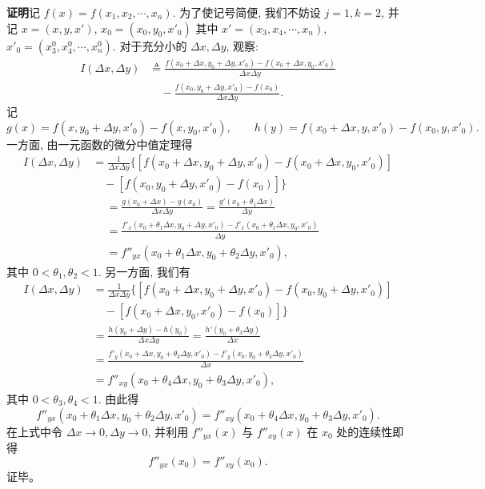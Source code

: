 \documentclass[UTF8,12pt,a4paper,fontset=fandol]{ctexart}
\begin{document}
\noindent\textbf{证明}\quad 记 $f(x)=f(x_1,x_2,\cdots,x_n)$. 为了使记号简便, 我们不妨设 $j=1,k=2$, 并记 $x=(x,y,x')$, $x_0=(x_0,y_0,x'_0)$ 其中 $x'=(x_3,x_4,\cdots,x_n)$, $x'_0=(x_3^0,x_4^0,\cdots,x_n^0)$. 对于充分小的 $\Delta x,\Delta y$, 观察:
\[
\begin{aligned}
  I(\Delta x,\Delta y)
  &\triangleq
  \frac{f(x_0+\Delta x,y_0+\Delta y,x'_0)-f(x_0+\Delta x,y_0,x'_0)}{\Delta x\Delta y}\\
  &\quad-\frac{f(x_0,y_0+\Delta y,x'_0)-f(x_0)}{\Delta x\Delta y}.
\end{aligned}
\]
记
\[
  g(x)=f(x,y_0+\Delta y,x'_0)-f(x,y_0,x'_0),
  \qquad
  h(y)=f(x_0+\Delta x,y,x'_0)-f(x_0,y,x'_0).
\]
一方面, 由一元函数的微分中值定理得
\[
\begin{aligned}
  I(\Delta x,\Delta y)
  &=\frac1{\Delta x\Delta y}
  \{[f(x_0+\Delta x,y_0+\Delta y,x'_0)-f(x_0+\Delta x,y_0,x'_0)]\\
  &\quad-[f(x_0,y_0+\Delta y,x'_0)-f(x_0)]\}
\end{aligned}
\]
\[
\begin{aligned}
  &=\frac{g(x_0+\Delta x)-g(x_0)}{\Delta x\Delta y}
  =\frac{g'(x_0+\theta_1\Delta x)}{\Delta y}\\
  &=\frac{f'_x(x_0+\theta_1\Delta x,y_0+\Delta y,x'_0)
  -f'_x(x_0+\theta_1\Delta x,y_0,x'_0)}{\Delta y}\\
  &=f''_{yx}(x_0+\theta_1\Delta x,y_0+\theta_2\Delta y,x'_0),
\end{aligned}
\]
其中 $0<\theta_1,\theta_2<1$. 另一方面, 我们有
\[
\begin{aligned}
  I(\Delta x,\Delta y)
  &=\frac1{\Delta x\Delta y}
  \{[f(x_0+\Delta x,y_0+\Delta y,x'_0)-f(x_0,y_0+\Delta y,x'_0)]\\
  &\quad-[f(x_0+\Delta x,y_0,x'_0)-f(x_0)]\}\\
  &=\frac{h(y_0+\Delta y)-h(y_0)}{\Delta x\Delta y}
  =\frac{h'(y_0+\theta_3\Delta y)}{\Delta x}\\
  &=\frac{f'_y(x_0+\Delta x,y_0+\theta_3\Delta y,x'_0)
  -f'_y(x_0,y_0+\theta_3\Delta y,x'_0)}{\Delta x}\\
  &=f''_{xy}(x_0+\theta_4\Delta x,y_0+\theta_3\Delta y,x'_0),
\end{aligned}
\]
其中 $0<\theta_3,\theta_4<1$. 由此得
\[
  f''_{yx}(x_0+\theta_1\Delta x,y_0+\theta_2\Delta y,x'_0)
  =f''_{xy}(x_0+\theta_4\Delta x,y_0+\theta_3\Delta y,x'_0).
\]
在上式中令 $\Delta x\to0,\Delta y\to0$, 并利用 $f''_{yx}(x)$ 与 $f''_{xy}(x)$ 在 $x_0$ 处的连续性即得
\[
  f''_{yx}(x_0)=f''_{xy}(x_0).
\]
证毕。
\end{document}
